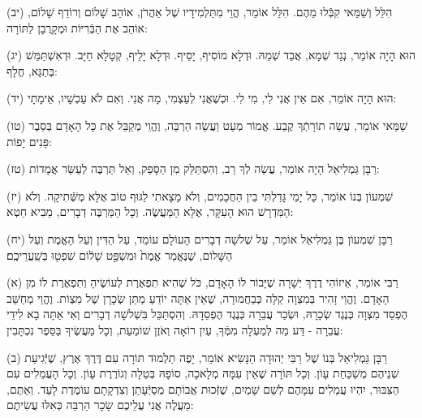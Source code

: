 \documentclass[twoside, openany, parskip=half, 11pt]{book}
\begin{document}
(יב) הִלֵּל וְשַׁמַּאי קִבְּֿלוּ מֵהֶם. הִלֵּל אוֹמֵר, הֱוֵי מִתַּלְמִידָיו שֶׁל אַהֲרֹן, אוֹהֵב שָׁלוֹם וְרוֹדֵף שָׁלוֹם, אוֹהֵב אֶת הַבְּֿרִיּוֹת וּמְקָרֲבָן לַתּוֹרָה:

(יג) הוּא הָיָה אוֹמֵר, נְגַד שְׁמָא, אֲבַד שְׁמֵהּ. וּדְלָא מוֹסִיף, יָסֵיף. וּדְלָא יָלֵיף, קְטָלָא חַיָּב. וּדְאִשְׁתַּמֵּשׁ בְּתַגָּא, חֳלָף:

(יד) הוּא הָיָה אוֹמֵר, אִם אֵין אֲנִי לִי, מִי לִי. וּכְשֶׁאֲנִי לְעַצְמִי, מָה אֲנִי. וְאִם לֹא עַכְשָׁיו, אֵימָתָי:

(טו) שַׁמַּאי אוֹמֵר, עֲשֵׂה תוֹרָתְֿךָ קֶבַע. אֱמוֹר מְעַט וַעֲשֵׂה הַרְבֵּה, וֶהֱוֵי מְקַבֵּל אֶת כָּל הָאָדָם בְּסֵבֶר פָּנִים יָפוֹת:

(טז) רַבָּן גַּמְלִיאֵל הָיָה אוֹמֵר, עֲשֵׂה לְךָ רַב, וְהִסְתַּלֵּק מִן הַסָּפֵק, וְאַל תַּרְבֶּה לְעַשֵּׂר אֳמָדוֹת:

(יז) שִׁמְעוֹן בְּנוֹ אוֹמֵר, כָּל יָמַי גָּדַלְתִּי בֵין הַחֲכָמִים, וְלֹא מָצָאתִי לַגּוּף טוֹב אֶלָּא מְשְּֿׁתִיקָה. וְלֹא הַמִּדְרָשׁ הוּא הָעִקָּר, אֶלָּא הַמַּעֲשֶׂה. וְכָל
הַמַּרְבֶּה דְבָרִים, מֵבִיא חֵטְא:



(יח) רַבָּן שִׁמְעוֹן בֶּן גַּמְלִיאֵל אוֹמֵר, עַל שְׁלשָׁה דְבָרִים הָעוֹלָם עוֹמֵד, עַל הַדִּין וְעַל הָאֱמֶת וְעַל הַשָּׁלוֹם, שֶׁנֶּאֱמַר אֱמֶת֙ וּמִשְׁפַּ֣ט שָׁל֔וֹם שִׁפְט֖וּ בְּשַֽׁעֲרֵיכֶֽם׃





\kolyisroel

(א) רַבִּי אוֹמֵר, אֵיזוֹהִי דֶרֶךְ יְשָׁרָה שֶׁיָּבוֹר לוֹ הָאָדָם, כֹּל שֶׁהִיא תִפְאֶרֶת לְעוֹשֶׂיהָ וְתִפְאֶרֶת לוֹ מִן הָאָדָם.
וֶהֱוֵי זָהִיר בְּמִצְוָה קַלָּה כְּבַחֲמוּרָה, שֶׁאֵין אַתָּה יוֹדֵעַ מַתַּן שְׂכָרָן שֶׁל מִצְוֹת. וֶהֱוֵי מְחַשֵּׁב הֶפְסֵד מִצְוָה כְּנֶגֶד שְׂכָרָהּ, וּשְׂכַר עֲבֵרָה כְּנֶגֶד הֶפְסֵדָהּ.
וְהִסְתַּכֵּל בִּשְׁלשָׁה דְבָרִים וְאִי אַתָּה בָא לִידֵי עֲבֵרָה - דַּע מַה לְּמַעְלָה מִמְּֿךָ, עַיִן רוֹאָה וְאֹזֶן שׁוֹמַעַת, וְכָל מַעֲשֶׂיךָ בַּסֵּפֶר נִכְתָּבִין:

(ב) רַבָּן גַּמְלִיאֵל בְּנוֹ שֶׁל רַבִּי יְהוּדָה הַנָּשִׂיא אוֹמֵר, יָפֶה תַלְמוּד תּוֹרָה עִם דֶּרֶךְ אֶרֶץ, שֶׁיְּֿגִיעַת שְׁנֵיהֶם מְשַׁכַּחַת עָוֹן.
וְכָל תּוֹרָה שֶׁאֵין עִמָּהּ מְלָאכָה, סוֹפָהּ בְּטֵלָה וְגוֹרֶרֶת עָוֹן. וְכָל הָעֲמֵלִים עִם הַצִּבּוּר, יִהְיוּ עֲמֵלִים עִמָּהֶם לְשֵׁם שָׁמַיִם, שֶׁזְּֿכוּת אֲבוֹתָם מְסַיְּֿעָתַן וְצִדְקָתָם עוֹמֶדֶת לָעַד. וְאַתֶּם, מַעֲלֶה אֲנִי עֲלֵיכֶם שָׂכָר הַרְבֵּה כְּאִלּוּ עֲשִׂיתֶם:
\end{document}
